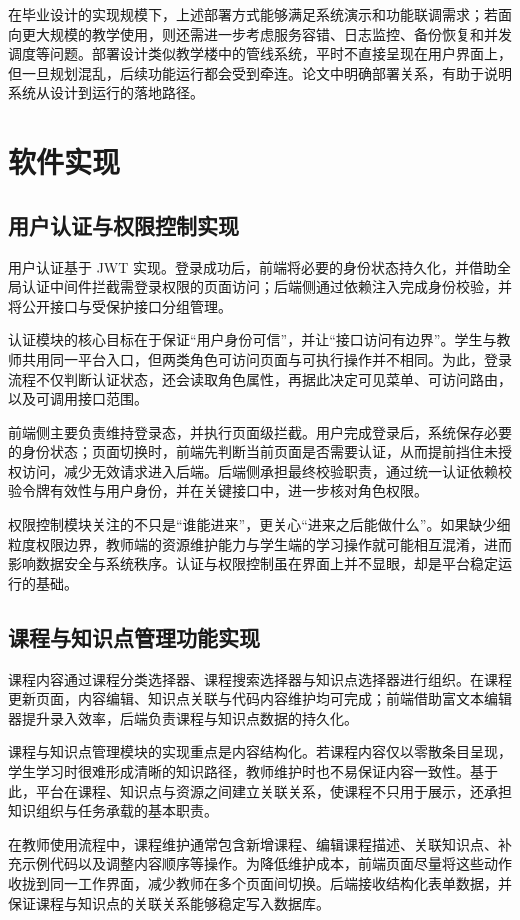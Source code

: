 在毕业设计的实现规模下，上述部署方式能够满足系统演示和功能联调需求；若面向更大规模的教学使用，则还需进一步考虑服务容错、日志监控、备份恢复和并发调度等问题。部署设计类似教学楼中的管线系统，平时不直接呈现在用户界面上，但一旦规划混乱，后续功能运行都会受到牵连。论文中明确部署关系，有助于说明系统从设计到运行的落地路径。


\chapter{软件实现}

\section{用户认证与权限控制实现}
用户认证基于 JWT 实现。登录成功后，前端将必要的身份状态持久化，并借助全局认证中间件拦截需登录权限的页面访问；后端侧通过依赖注入完成身份校验，并将公开接口与受保护接口分组管理。

认证模块的核心目标在于保证“用户身份可信”，并让“接口访问有边界”。学生与教师共用同一平台入口，但两类角色可访问页面与可执行操作并不相同。为此，登录流程不仅判断认证状态，还会读取角色属性，再据此决定可见菜单、可访问路由，以及可调用接口范围。

前端侧主要负责维持登录态，并执行页面级拦截。用户完成登录后，系统保存必要的身份状态；页面切换时，前端先判断当前页面是否需要认证，从而提前挡住未授权访问，减少无效请求进入后端。后端侧承担最终校验职责，通过统一认证依赖校验令牌有效性与用户身份，并在关键接口中，进一步核对角色权限。

权限控制模块关注的不只是“谁能进来”，更关心“进来之后能做什么”。如果缺少细粒度权限边界，教师端的资源维护能力与学生端的学习操作就可能相互混淆，进而影响数据安全与系统秩序。认证与权限控制虽在界面上并不显眼，却是平台稳定运行的基础。

\section{课程与知识点管理功能实现}
课程内容通过课程分类选择器、课程搜索选择器与知识点选择器进行组织。在课程更新页面，内容编辑、知识点关联与代码内容维护均可完成；前端借助富文本编辑器提升录入效率，后端负责课程与知识点数据的持久化。

课程与知识点管理模块的实现重点是内容结构化。若课程内容仅以零散条目呈现，学生学习时很难形成清晰的知识路径\cite{hwang2013conceptmap}，教师维护时也不易保证内容一致性。基于此，平台在课程、知识点与资源之间建立关联关系，使课程不只用于展示，还承担知识组织与任务承载的基本职责。

在教师使用流程中，课程维护通常包含新增课程、编辑课程描述、关联知识点、补充示例代码以及调整内容顺序等操作。为降低维护成本，前端页面尽量将这些动作收拢到同一工作界面，减少教师在多个页面间切换。后端接收结构化表单数据，并保证课程与知识点的关联关系能够稳定写入数据库。

